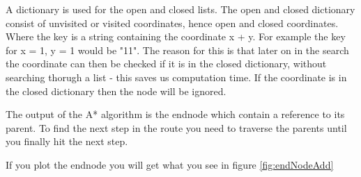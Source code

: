 A dictionary is used for the open and closed lists. The open and closed dictionary consist of unvisited or visited coordinates, hence open and closed coordinates. Where the key is a string containing the coordinate x + y. For example the key for x = 1, y = 1 would be "11". The reason for this is that later on in the search the coordinate can then be checked if it is in the closed dictionary, without searching thorugh a list - this saves us computation time. If the coordinate is in the closed dictionary then the node will be ignored.

The output of the A* algorithm is the endnode which contain a reference to its parent. To find the next step in the route you need to traverse the parents until you finally hit the next step.

If you plot the endnode you will get what you see in figure \ref{fig:endNodeAdd}

